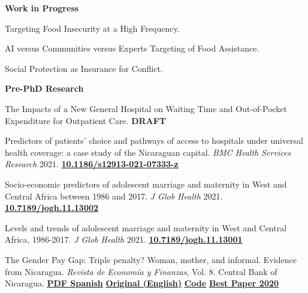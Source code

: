 \documentclass[10pt]{article}
\newcommand{\link}[2]{\href{#1}{\textcolor{cvloc}{\textbf{#2}}}}
\newcommand{\todolink}[1]{\textcolor{cvloc}{\textbf{#1}}}
\begin{document}
\textbf{Work in Progress}\par
\begin{sqlist}[itemsep=8pt]
  \item Targeting Food Insecurity at a High Frequency.
  \item AI versus Communities versus Experts Targeting of Food Assistance.
  \item Social Protection as Insurance for Conflict.
\end{sqlist}
\textbf{Pre-PhD Research}\par
\begin{sqlist}[itemsep=8pt]
  \item The Impacts of a New General Hospital on Waiting Time and Out-of-Pocket Expenditure for Outpatient Care. \todolink{DRAFT}
  \item Predictors of patients' choice and pathways of access to hospitals under universal health coverage: a case study of the Nicaraguan capital. \textit{BMC Health Services Research} 2021. \link{https://doi.org/10.1186/s12913-021-07333-z}{10.1186/s12913-021-07333-z}
  \item Socio-economic predictors of adolescent marriage and maternity in West and Central Africa between 1986 and 2017. \textit{J Glob Health} 2021. \link{https://doi.org/10.7189/jogh.11.13002}{10.7189/jogh.11.13002}
  \item Levels and trends of adolescent marriage and maternity in West and Central Africa, 1986-2017. \textit{J Glob Health} 2021. \link{https://doi.org/10.7189/jogh.11.13001}{10.7189/jogh.11.13001}
  \item The Gender Pay Gap: Triple penalty? Woman, mother, and informal. Evidence from Nicaragua. \textit{Revista de Economía y Finanzas}, Vol. 8. Central Bank of Nicaragua. \link{https://www.bcn.gob.ni/sites/default/files/revista/volumenVIII/Revista_Vol_8_202P1.pdf}{\underline{PDF Spanish}} \link{https://jonathangarciaf.github.io/files/papers/triple_penalty_gender_wage_gap_en.pdf}{\underline{Original (English)}} \link{https://github.com/jonathangarciaf/triple_penalty_gender_pay_gap}{\underline{Code}} \link{https://bcn.gob.ni/nota-de-prensa/bcn-realiza-ceremonia-de-premiacion-del-premio-de-economia-finanzas-y-desarrollo}{\underline{Best Paper 2020}}
\end{sqlist}

\newpage
\end{document}
